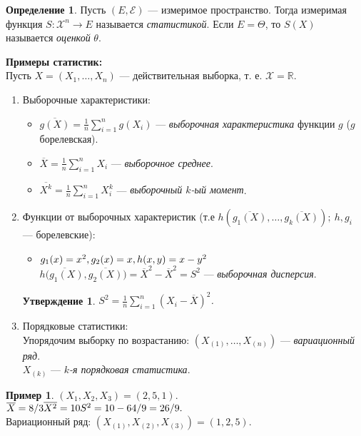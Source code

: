\documentclass[12pt]{report}
\newtheorem{proposition}{Утверждение}
\theoremstyle{definition}
\newtheorem{definition}{Определение}
\newtheorem{example}{Пример}
\begin{document}
\begin{definition}
	Пусть $(E, \mathcal{E})$ — измеримое пространство. Тогда измеримая функция $S: \mathscr{X}^n \rightarrow E$ называется \emph{статистикой}. Если $E = \Theta$, то $S(X)$ называется \emph{оценкой} $\theta$.
\end{definition}
\textbf{Примеры статистик:}\\
Пусть $X = (X_1, \dots, X_n)$ — действительная выборка, т. е. $\mathscr{X} = \mathbb{R}$.
\begin{enumerate}
	\item Выборочные характеристики:
		\begin{itemize}
			\item $\overline{g(X)} = \frac{1}{n}\sum\limits_{i=1}^{n} g(X_i)$ — \emph{выборочная характеристика} функции $g$ ($g$ борелевская).
			\item $\overline{X} = \frac{1}{n}\sum\limits_{i=1}^{n} X_i$ — \emph{выборочное среднее}.
			\item $\overline{X^k} = \frac{1}{n}\sum\limits_{i=1}^{n} X_i^k$ — \emph{выборочный $k$-ый момент}.
		\end{itemize}
     
	\item Функции от выборочных характеристик (т.е $h(\overline{g_1(X)}, \dots, \overline{g_k(X)});\ h, g_i$ — борелевские):
		\begin{itemize}
			\item $g_1(x) = x^2, g_2(x) = x, h(x, y) = x - y^2 \\$ $h\overline{(g_1(X)}, \overline{g_2(X)}) = \overline{X}^2 - \overline{X}^2 = S^2$ — \emph{выборочная дисперсия}.  
		\end{itemize}
  
		\begin{proposition}
			$S^2 = \frac{1}{n} \sum\limits_{i=1}^{n}(X_i - \overline{X})^2$.
		\end{proposition}
	\item Порядковые статистики:\\
     Упорядочим выборку по возрастанию: $(X_{(1)}, \dots, X_{(n)})$ — \emph{вариационный ряд}.\\
      $X_{(k)}$ — \emph{$k$-я порядковая статистика}.\\
\end{enumerate}


\begin{example}
	$(X_1, X_2, X_3) = (2, 5, 1).$\\
	$\overline{X} = 8/3 \\ \overline{X^2} = 10 \\ S^2 = 10 - 64/9 = 26/9.$\\
	Вариационный ряд: $(X_{(1)}, X_{(2)}, X_{(3)}) = (1, 2, 5).$
\end{example}
\end{document}
